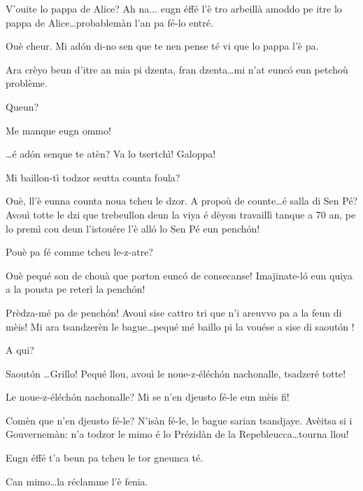 \begin{drama}
\Guillaumespeaks{} V'ouite lo pappa de Alice? Ah na... eugn éffé l'è tro arbeillà amoddo pe itre lo pappa de Alice\ldots probablemàn l'an pa fé-lo entré.

\Cheriespeaks Ouè cheur.  Mi ad\'on di-no sen que te nen pense té vi que lo pappa l'è pa.

\Alicespeaks Ara crèyo beun d'itre an mia pi dzenta, fran dzenta\ldots mi n'at eunc\'o eun petchoù problème.

\Cheriespeaks Queun?

\Alicespeaks Me manque eugn ommo!

\Cheriespeaks \ldots é ad\'on senque te atèn? Va lo tsertchì! Galoppa!




  
\Vioujspeaks Mi baillon-tì todzor seutta counta foula?

\Vioupspeaks Ouè, ll'è eunna counta noua tcheu le dzor. A propoù de counte\ldots é salla di Sen Pé? Avouì totte le dzi que trebeullon deun la viya é dèyon travaillì tanque a 70 an, pe lo premì cou deun l'istouére l'è all\'o lo Sen Pé eun pench\'on!

\Vioujspeaks Pouè pa fé comme tcheu le-z-atre?

\Vioupspeaks Ouè pequé son de chouà que porton eunc\'o de consecanse! Imajinate-l\'o eun quiya a la pousta pe reterì la pench\'on! 

\Vioujspeaks Prèdza-mé pa de pench\'on! Avouì sise cattro tri que n'i areuvvo pa a la feun di mèis! Mi ara tsandzerèn le bague\ldots pequé mé baillo pi la vouése a sise di saout\'on !

\Vioupspeaks A qui?

\Vioujspeaks Saout\'on \ldots Grillo! Pequé llou, avouì le noue-z-éléch\'on nachonalle, tsadzeré totte!

\Vioupspeaks Le noue-z-éléch\'on nachonalle? Mi se n'en djeusto fé-le eun mèis fi!

\Vioujspeaks Comèn que n'en djeusto fé-le? N'isàn fé-le, le bague sarian tsandjaye. Avèitsa si i Gouvernemàn: n'a todzor le mimo é lo Prézidàn de la Repebleucca\ldots tourna llou!

\Vioupspeaks Eugn éffé t'a beun pa tcheu le tor gneunca té.

\Vioujspeaks{} Can mimo\ldots la réclamme l'è fenia.


\end{drama}
